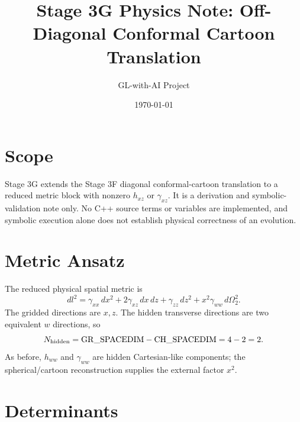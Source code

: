 \documentclass[11pt]{article}
\title{Stage 3G Physics Note: Off-Diagonal Conformal Cartoon Translation}
\author{GL-with-AI Project}
\date{\today}
\begin{document}
\maketitle

\section{Scope}

Stage 3G extends the Stage 3F diagonal conformal-cartoon translation to a
reduced metric block with nonzero \(h_{xz}\) or \(\gamma_{xz}\). It is a
derivation and symbolic-validation note only. No C++ source terms or variables
are implemented, and symbolic execution alone does not establish physical
correctness of an evolution.

\section{Metric Ansatz}

The reduced physical spatial metric is
\begin{equation}
  dl^2
  =
  \gamma_{xx}\,dx^2
  +
  2\gamma_{xz}\,dx\,dz
  +
  \gamma_{zz}\,dz^2
  +
  x^2\gamma_{ww}\,d\Omega_2^2 .
\end{equation}
The gridded directions are \(x,z\). The hidden transverse directions are two
equivalent \(w\) directions, so
\begin{equation}
  N_{\rm hidden}
  =
  \mathrm{GR\_SPACEDIM}-\mathrm{CH\_SPACEDIM}
  =
  4-2=2.
\end{equation}
As before, \(h_{ww}\) and \(\gamma_{ww}\) are hidden Cartesian-like components;
the spherical/cartoon reconstruction supplies the external factor \(x^2\).

\section{Determinants}
\end{document}
